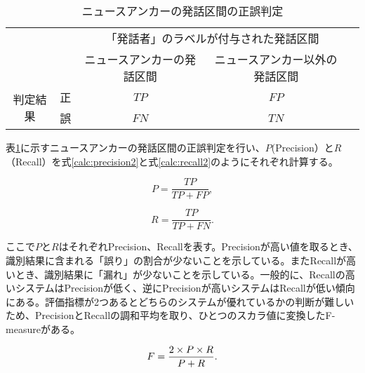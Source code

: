 \begin{table}[H]
\begin{center}
    \caption{ニュースアンカーの発話区間の正誤判定 \label{table:clustering}}
\begin{tabular}{|c|c|c|c|l}
\cline{1-4}
\multicolumn{2}{|c|}{\multirow{2}{*}{}} & \multicolumn{2}{c|}{「発話者」のラベルが付与された発話区間} &  \\ \cline{3-4}
\multicolumn{2}{|c|}{}                  & ニュースアンカーの発話区間        & ニュースアンカー以外の発話区間        &  \\ \cline{1-4}
\multirow{2}{*}{判定結果}        & 正        & $TP$                  & $FP$                   &  \\ \cline{2-4}
& 誤        & $FN$                  & $TN$                   &  \\ \cline{1-4}
\end{tabular}
\end{center}
\end{table}

表\ref{table:clustering}に示すニュースアンカーの発話区間の正誤判定を行い、$P$(Precision）と$R$（Recall）を式\ref{calc:precision2}と式\ref{calc:recall2}のようにそれぞれ計算する。

\begin{equation}
\label{calc:precision2}
P = \frac{TP}{TP + FP},
\end{equation}

\begin{equation}
\label{calc:recall2}
R = \frac{TP}{TP + FN}.
\end{equation}

ここで$P$と$R$はそれぞれPrecision、Recallを表す。Precisionが高い値を取るとき、識別結果に含まれる「誤り」の割合が少ないことを示している。またRecallが高いとき、識別結果に「漏れ」が少ないことを示している。一般的に、Recallの高いシステムはPrecisionが低く、逆にPrecisionが高いシステムはRecallが低い傾向にある。評価指標が2つあるとどちらのシステムが優れているかの判断が難しいため、PrecisionとRecallの調和平均を取り、ひとつのスカラ値に変換したF-measureがある。

\begin{equation}
\label{calc:fmeasure}
F = \frac{2 \times P \times R}{P + R}. \notag
\end{equation}

\begin{comment}
また、検出したニュースアンカーの発話区間の時間の割合を式\ref{calc:anchor_acc}を用いて評価する。

\begin{equation}
\label{calc:anchor_acc}
Acc_{time} = \frac{検出したニュースアンカーの発話の時間数}{ニュースアンカーの発話の時間数}.
\end{equation}
\end{comment}

